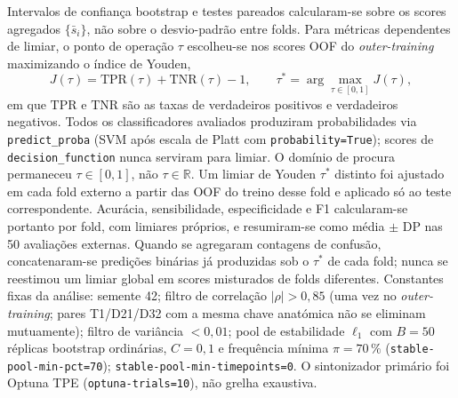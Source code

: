 \documentclass[review]{elsarticle}
\newcommand{\code}[1]{\texttt{#1}}
\begin{document}
Intervalos de confiança bootstrap e testes pareados calcularam-se sobre os scores agregados $\{\bar{s}_i\}$, não sobre o desvio-padrão entre folds.
Para métricas dependentes de limiar, o ponto de operação $\tau$ escolheu-se nos scores OOF do \emph{outer-training} maximizando o índice de Youden,
\begin{equation}
J(\tau) = \mathrm{TPR}(\tau) + \mathrm{TNR}(\tau) - 1,
\qquad
\tau^{*} = \arg\max_{\tau \in [0,1]} J(\tau),
\label{eq:youden}
\end{equation}
em que $\mathrm{TPR}$ e $\mathrm{TNR}$ são as taxas de verdadeiros positivos e verdadeiros negativos.
Todos os classificadores avaliados produziram probabilidades via \code{predict\_proba} (SVM após escala de Platt com \code{probability=True}); scores de \code{decision\_function} nunca serviram para limiar.
O domínio de procura permaneceu $\tau\in[0,1]$, não $\tau\in\mathbb{R}$.
Um limiar de Youden $\tau^{*}$ distinto foi ajustado em cada fold externo a partir das OOF do treino desse fold e aplicado só ao teste correspondente.
Acurácia, sensibilidade, especificidade e F1 calcularam-se portanto por fold, com limiares próprios, e resumiram-se como média $\pm$ DP nas 50 avaliações externas.
Quando se agregaram contagens de confusão, concatenaram-se predições binárias já produzidas sob o $\tau^{*}$ de cada fold; nunca se reestimou um limiar global em scores misturados de folds diferentes.
Constantes fixas da análise: semente 42; filtro de correlação $|\rho|>0{,}85$ (uma vez no \emph{outer-training}; pares T1/D21/D32 com a mesma chave anatómica não se eliminam mutuamente); filtro de variância $<0{,}01$; pool de estabilidade $\ell_1$ com $B=50$ réplicas bootstrap ordinárias, $C=0{,}1$ e frequência mínima $\pi=70\,\%$ (\code{stable-pool-min-pct=70}); \code{stable-pool-min-timepoints=0}.
O sintonizador primário foi Optuna TPE (\code{optuna-trials=10}), não grelha exaustiva.
\end{document}
